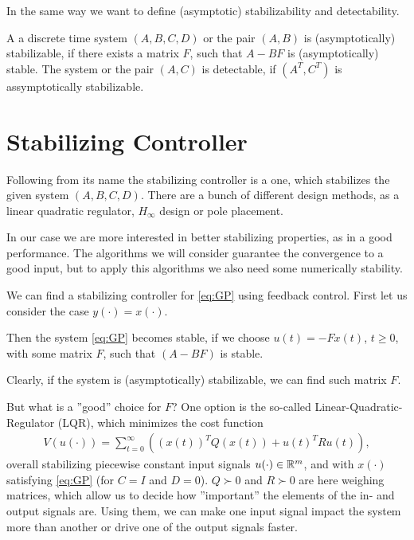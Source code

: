 In the same way we want to define (asymptotic) stabilizability and detectability. 
\begin{defi}
A a discrete time system $(A, B, C, D)$ or the pair $(A, B)$ is (asymptotically) stabilizable, if there exists a matrix $F$, such that $A - BF$ is (asymptotically) stable.
The system or the pair $(A,C)$ is detectable, if $(A^T, C^T)$ is assymptotically stabilizable. 
\end{defi}



\section{Stabilizing Controller}
\label{sch:stabilizingController}

Following from its name the stabilizing controller is a one, which stabilizes the given system $(A,B,C,D)$. There are a bunch of different design methods, as a linear quadratic regulator, $H_\infty$ design or pole placement. 

In our case we are more interested in better stabilizing properties, as in a good performance. The algorithms we will consider guarantee the convergence to a good input, but to apply this algorithms we also need some numerically stability. 

We can find a stabilizing controller for \eqref{eq:GP} using feedback control.
First let us consider the case $y(\cdot) = x(\cdot)$.

%
%

Then the system \eqref{eq:GP} becomes stable, if we choose $u(t) = -Fx(t)$, $t \geq 0$, with some matrix $F$, such that $(A - BF)$ is stable.

Clearly, if the system is (asymptotically) stabilizable, we can find such matrix $F$. 

But what is a ''good'' choice for $F$? One option is the so-called Linear-Quadratic-Regulator (LQR), which minimizes the cost function 
\begin{align}
\label{eq:costFcn}
V(u(\cdot)) = \sum_{t = 0}^\infty \left( (x(t))^T Q (x(t)) + u(t)^T R u(t)\right),
\end{align}
overall stabilizing piecewise constant input signals $u(\cdot) \in {\mathbb{R}}^m$, and with $x(\cdot)$ satisfying \eqref{eq:GP} (for $C = I$ and $D = 0$). 
$Q \succ 0$ and $R \succ 0$ are here weighing matrices, which allow us to decide how ''important'' the elements of the in- and output signals are.  
Using them, we can make one input signal impact the system more than another or drive one of the output signals faster. 

